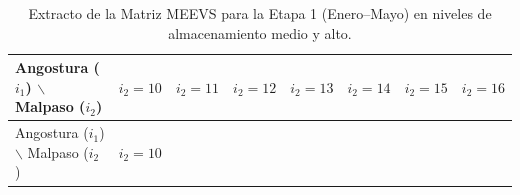 \documentclass[
  spanish,
  letterpaper,
]{scrreprt}
\theoremstyle{definition}
\theoremstyle{remark}
\begin{document}
\begin{longtable}[]{@{}
  >{\raggedright\arraybackslash}p{}
  >{\centering\arraybackslash}p{}
  >{\centering\arraybackslash}p{}
  >{\centering\arraybackslash}p{}
  >{\centering\arraybackslash}p{}
  >{\centering\arraybackslash}p{}
  >{\centering\arraybackslash}p{}
  >{\centering\arraybackslash}p{}@{}}
\caption{Extracto de la Matriz MEEVS para la Etapa 1 (Enero--Mayo) en
niveles de almacenamiento medio y alto.}\tabularnewline
\toprule\noalign{}
\begin{minipage}[b]{\linewidth}\raggedright
Angostura (\(i_1\)) \(\backslash\) Malpaso (\(i_2\))
\end{minipage} & \begin{minipage}[b]{\linewidth}\centering
\(i_2 = 10\)
\end{minipage} & \begin{minipage}[b]{\linewidth}\centering
\(i_2 = 11\)
\end{minipage} & \begin{minipage}[b]{\linewidth}\centering
\(i_2 = 12\)
\end{minipage} & \begin{minipage}[b]{\linewidth}\centering
\(i_2 = 13\)
\end{minipage} & \begin{minipage}[b]{\linewidth}\centering
\(i_2 = 14\)
\end{minipage} & \begin{minipage}[b]{\linewidth}\centering
\(i_2 = 15\)
\end{minipage} & \begin{minipage}[b]{\linewidth}\centering
\(i_2 = 16\)
\end{minipage} \\
\midrule\noalign{}
\endfirsthead
\toprule\noalign{}
\begin{minipage}[b]{\linewidth}\raggedright
Angostura (\(i_1\)) \(\backslash\) Malpaso (\(i_2\))
\end{minipage} & \begin{minipage}[b]{\linewidth}\centering
\(i_2 = 10\)
\end{minipage} & \begin{minipage}[b]{\linewidth}\centering

\end{minipage}
\end{longtable}
\end{document}
